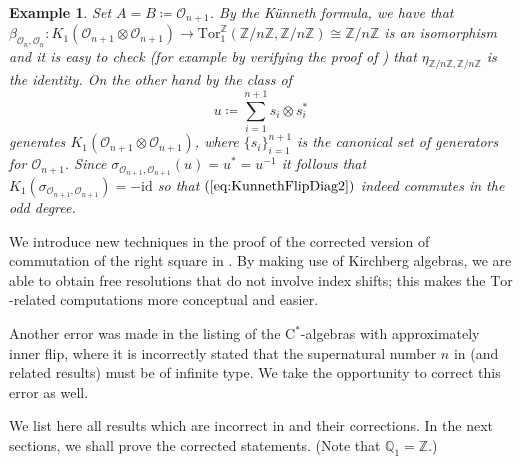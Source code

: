 \documentclass[a4paper,10pt]{amsart}
\newcommand{\cstar}{\ensuremath{\mathrm C^\ast}}
\newcounter{theorem}
\newtheorem{example}[theorem]{Example}
\numberwithin{equation}{section}
\numberwithin{theorem}{section}
\newcommand{\Q}{\mathbb{Q}}
\newcommand{\Z}{\mathbb{Z}}
\newcommand{\Tor}{\mathrm{Tor}_1^{\Z}}
\newcommand{\id}{\mathrm{id}}
\begin{document}
\begin{example}
	Set $A = B \coloneqq \mathcal O_{n+1}$. By the K{\"u}nneth formula, we have that $\beta_{\mathcal O_n, \mathcal O_n} \colon K_1(\mathcal O_{n+1} \otimes \mathcal O_{n+1}) \to \Tor(\Z/n\Z, \Z/n\Z) \cong \Z/n\Z$ is an isomorphism and it is easy to check (for example by verifying the proof of \cite[Proposition 5.1]{aifK}) that $\eta_{\Z/n\Z,\Z/n\Z}$ is the identity. On the other hand by \cite[Proposition 3.5]{FHRT} the class of 
	$$
		u \coloneqq \sum_{i=1}^{n+1} s_i \otimes s_i^*
	$$
	generates $K_1(\mathcal O_{n+1} \otimes \mathcal O_{n+1})$, where $\{s_i\}_{i=1}^{n+1}$ is the canonical set of generators for $\mathcal O_{n+1}$. Since $\sigma_{\mathcal O_{n+1},\mathcal O_{n+1}}(u) = u^* = u^{-1}$ it follows that $K_1(\sigma_{\mathcal O_{n+1}, \mathcal O_{n+1}}) = -\id$ so that $(\ref{eq:KunnethFlipDiag2})$ indeed commutes in the  odd degree.
\end{example}


We introduce new techniques in the proof of the corrected version of commutation of the right square in \cite[Eq.\ (4.2)]{aifK}.
By making use of Kirchberg algebras, we are able to obtain free resolutions that do not involve index shifts; this makes the $\mathrm{Tor}$-related computations more conceptual and easier.

Another error was made in the listing of the $\cstar$-algebras with approximately inner flip, where it is incorrectly stated that the supernatural number $n$ in \cite[Theorem 2.2]{aifK} (and related results) must be of infinite type.
We take the opportunity to correct this error as well.

We list here all results which are incorrect in \cite{aifK} and their corrections.
In the next sections, we shall prove the corrected statements.
(Note that $\Q_1=\Z$.)
\end{document}
